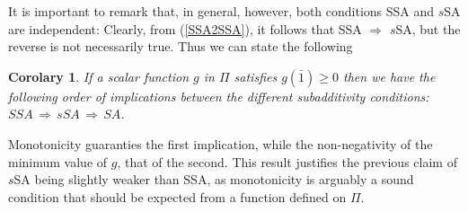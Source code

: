 \documentclass[twocolumn,aps,sort,nofootinbib]{revtex4}
\newtheorem{corolary}{Corolary}[section]
\begin{document}
\begin{appendix}
It is important to remark that, in general, however, 
both conditions SSA and $s$SA are independent:
Clearly, from (\ref{SSA2SSA}), it follows that  
SSA $\Rightarrow$ $s$SA, but the reverse is not necessarily true.
Thus we can state the following
\begin{corolary}
If a scalar function $g$ in $\Pi$ satisfies 
$g(\bar{1})\ge 0$ then we have the following order
of implications between the different subadditivity conditions:
$SSA\,\Rightarrow\, sSA\,\Rightarrow\, SA$.
\end{corolary}
Monotonicity guaranties the first implication, while the non-negativity of the minimum 
value of $g$, that of the second.
This result justifies the previous claim of $s$SA being slightly weaker than SSA, as 
monotonicity is arguably a sound condition that should be expected from a function defined
on $\Pi$.


\end{appendix}
\end{document}
